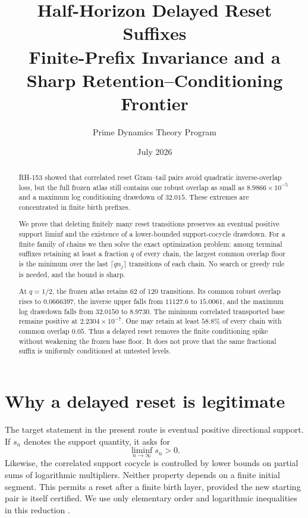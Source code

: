 \documentclass[12pt]{article}
\title{Half-Horizon Delayed Reset Suffixes\\\large Finite-Prefix Invariance and a Sharp Retention--Conditioning Frontier}
\author{Prime Dynamics Theory Program}
\date{July 2026}
\begin{document}
\maketitle

\begin{abstract}
RH-153 showed that correlated reset Gram--tail pairs avoid quadratic
inverse-overlap loss, but the full frozen atlas still contains one robust
overlap as small as $8.9866\times10^{-5}$ and a maximum log conditioning
drawdown of $32.015$.  These extremes are concentrated in finite birth
prefixes.

We prove that deleting finitely many reset transitions preserves an eventual
positive support liminf and the existence of a lower-bounded support-cocycle
drawdown.  For a finite family of chains we then solve the exact optimization
problem: among terminal suffixes retaining at least a fraction $q$ of every
chain, the largest common overlap floor is the minimum over the last
$\lceil qn_j\rceil$ transitions of each chain.  No search or greedy rule is
needed, and the bound is sharp.

At $q=1/2$, the frozen atlas retains 62 of 120 transitions.  Its common
robust overlap rises to $0.0666397$, the inverse upper falls from $11127.6$
to $15.0061$, and the maximum log drawdown falls from $32.0150$ to $8.9730$.
The minimum correlated transported base remains positive at
$2.2304\times10^{-7}$.  One may retain at least $58.8\%$ of every chain with
common overlap $0.05$.  Thus a delayed reset removes the finite conditioning
spike without weakening the frozen base floor.  It does not prove that the
same fractional suffix is uniformly conditioned at untested levels.
\end{abstract}

\section{Why a delayed reset is legitimate}
The target statement in the present route is eventual positive directional
support.  If $s_n$ denotes the support quantity, it asks for
\[
 \liminf_{n\to\infty}s_n>0.
\]
Likewise, the correlated support cocycle is controlled by lower bounds on
partial sums of logarithmic multipliers.  Neither property depends on a
finite initial segment.  This permits a reset after a finite birth layer,
provided the new starting pair is itself certified.  We use only elementary
order and logarithmic inequalities in this reduction
\citep{HardyLittlewoodPolya1952,HornJohnson2013}.
\end{document}
